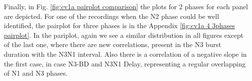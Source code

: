 Finally, in Fig. \ref{fig:cv1a pairplot comparison} the plots for 2 phases for each panel are depicted. For one of the recordings when the N2 phase could be well identified, the pairplot for three phases is in the Appendix \ref{fig:cv1a 4 3phases pairplot}. In the pariplot, again we see a similar distribution in all figures except of the last one, where there are new correlations, present in the N3 burst duration with the N3N1 interval. Also there is a correlation of a negative slope in the first case, in case N3-BD and N3N1 Delay, representing a regular overlapping of N1 and N3 phases. 
%

